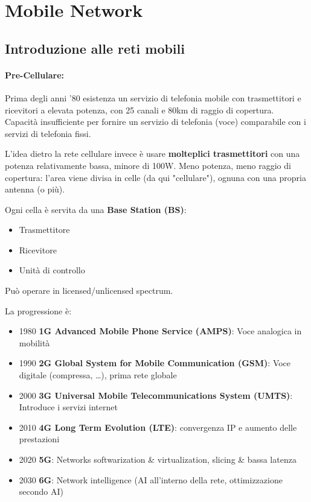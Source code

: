 \section{Mobile Network}

\subsection{Introduzione alle reti mobili}

\paragraph{Pre-Cellulare:} Prima degli anni '80 esistenza un servizio di telefonia mobile con trasmettitori e ricevitori a elevata potenza, con 25 canali e 80km di raggio di copertura. Capacità insufficiente per fornire un servizio di telefonia (voce) comparabile con i servizi di telefonia fissi.

L'idea dietro la rete cellulare invece è usare \textbf{molteplici trasmettitori} con una potenza relativamente bassa, minore di 100W. Meno potenza, meno raggio di copertura: l'area viene divisa in celle (da qui "cellulare"), ognuna con una propria antenna (o più).

Ogni cella è servita da una \textbf{Base Station (BS)}:
\begin{itemize}
	\item Trasmettitore

	\item Ricevitore

	\item Unità di controllo
\end{itemize}
Può operare in licensed/unlicensed spectrum.

La progressione è:
\begin{itemize}
	\item 1980 \textbf{1G Advanced Mobile Phone Service (AMPS)}: Voce analogica in mobilità

	\item 1990 \textbf{2G Global System for Mobile Communication (GSM)}: Voce digitale (compressa, \dots), prima rete globale

	\item 2000 \textbf{3G Universal Mobile Telecommunications System (UMTS)}: Introduce i servizi internet

	\item 2010 \textbf{4G Long Term Evolution (LTE)}: convergenza IP e aumento delle prestazioni

	\item 2020 \textbf{5G}: Networks softwarization \& virtualization, slicing \& bassa latenza

	\item 2030 \textbf{6G}: Network intelligence (AI all'interno della rete, ottimizzazione secondo AI)
\end{itemize}

